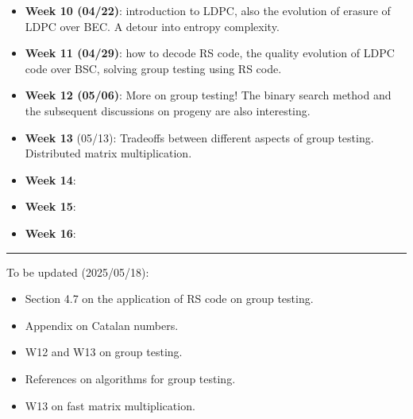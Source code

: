 \begin{itemize}
    \item \textbf{Week 10 (04/22)}: introduction to LDPC, also the evolution of erasure of LDPC over BEC. A detour into entropy complexity.
    \item \textbf{Week 11 (04/29)}: how to decode RS code, the quality evolution of LDPC code over BSC, solving group testing using RS code.
    \item \textbf{Week 12 (05/06)}: More on group testing! The binary search method and the subsequent discussions on progeny are also interesting.
    \item \textbf{Week 13} (05/13): Tradeoffs between different aspects of group testing. Distributed matrix multiplication.
    \item \textbf{Week 14}:
    \item \textbf{Week 15}:
    \item \textbf{Week 16}:
\end{itemize}

\vspace{1cm}
\hrule
To be updated (2025/05/18):
\begin{itemize}
    \item Section 4.7 on the application of RS code on group testing.
    \item Appendix on Catalan numbers.
    \item W12 and W13 on group testing.
    \item References on algorithms for group testing.
    \item W13 on fast matrix multiplication.
\end{itemize}